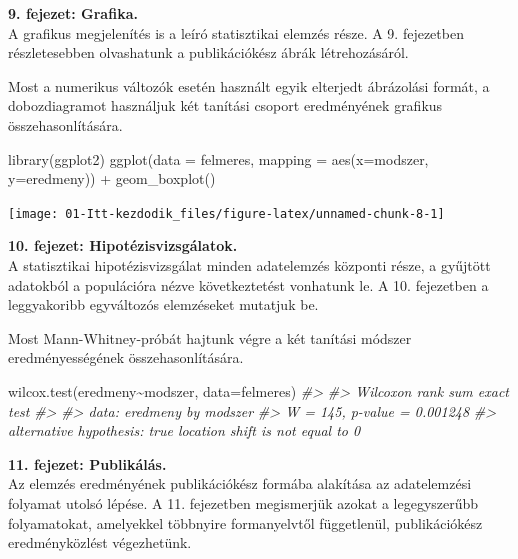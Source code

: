 \documentclass[
]{book}
\newenvironment{Shaded}{\begin{snugshade}}{\end{snugshade}}
\newcommand{\AttributeTok}[1]{\textcolor[rgb]{0.77,0.63,0.00}{#1}}
\newcommand{\CommentTok}[1]{\textcolor[rgb]{0.56,0.35,0.01}{\textit{#1}}}
\newcommand{\FunctionTok}[1]{\textcolor[rgb]{0.00,0.00,0.00}{#1}}
\newcommand{\NormalTok}[1]{#1}
\newcommand{\SpecialCharTok}[1]{\textcolor[rgb]{0.00,0.00,0.00}{#1}}
\begin{document}
\textbf{9. fejezet: Grafika.}\\
A grafikus megjelenítés is a leíró statisztikai elemzés része. A 9. fejezetben részletesebben olvashatunk a publikációkész ábrák létrehozásáról.

Most a numerikus változók esetén használt egyik elterjedt ábrázolási formát, a dobozdiagramot használjuk két tanítási csoport eredményének grafikus összehasonlítására.

\begin{Shaded}
\begin{Highlighting}[]
\FunctionTok{library}\NormalTok{(ggplot2)}
\FunctionTok{ggplot}\NormalTok{(}\AttributeTok{data =}\NormalTok{ felmeres, }\AttributeTok{mapping =} \FunctionTok{aes}\NormalTok{(}\AttributeTok{x=}\NormalTok{modszer, }\AttributeTok{y=}\NormalTok{eredmeny)) }\SpecialCharTok{+} \FunctionTok{geom\_boxplot}\NormalTok{()}
\end{Highlighting}
\end{Shaded}

\begin{center}\texttt{[image: 01-Itt-kezdodik\_files/figure-latex/unnamed-chunk-8-1]} \end{center}

\textbf{10. fejezet: Hipotézisvizsgálatok.}\\
A statisztikai hipotézisvizsgálat minden adatelemzés központi része, a gyűjtött adatokból a populációra nézve következtetést vonhatunk le. A 10. fejezetben a leggyakoribb egyváltozós elemzéseket mutatjuk be.

Most Mann-Whitney-próbát hajtunk végre a két tanítási módszer eredményességének összehasonlítására.

\begin{Shaded}
\begin{Highlighting}[]
\FunctionTok{wilcox.test}\NormalTok{(eredmeny}\SpecialCharTok{\textasciitilde{}}\NormalTok{modszer, }\AttributeTok{data=}\NormalTok{felmeres)}
\CommentTok{\#\textgreater{} }
\CommentTok{\#\textgreater{}  Wilcoxon rank sum exact test}
\CommentTok{\#\textgreater{} }
\CommentTok{\#\textgreater{} data:  eredmeny by modszer}
\CommentTok{\#\textgreater{} W = 145, p{-}value = 0.001248}
\CommentTok{\#\textgreater{} alternative hypothesis: true location shift is not equal to 0}
\end{Highlighting}
\end{Shaded}

\textbf{11. fejezet: Publikálás.}\\
Az elemzés eredményének publikációkész formába alakítása az adatelemzési folyamat utolsó lépése. A 11. fejezetben megismerjük azokat a legegyszerűbb folyamatokat, amelyekkel többnyire formanyelvtől függetlenül, publikációkész eredményközlést végezhetünk.
\end{document}
